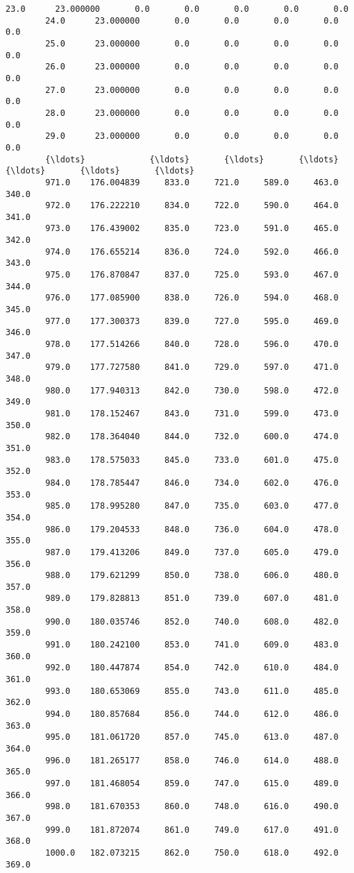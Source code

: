 \documentclass[11pt]{article}
\begin{document}
\begin{Verbatim}[commandchars=\\\{\}]
        23.0      23.000000       0.0       0.0       0.0       0.0       0.0   
        24.0      23.000000       0.0       0.0       0.0       0.0       0.0   
        25.0      23.000000       0.0       0.0       0.0       0.0       0.0   
        26.0      23.000000       0.0       0.0       0.0       0.0       0.0   
        27.0      23.000000       0.0       0.0       0.0       0.0       0.0   
        28.0      23.000000       0.0       0.0       0.0       0.0       0.0   
        29.0      23.000000       0.0       0.0       0.0       0.0       0.0   
        {\ldots}             {\ldots}       {\ldots}       {\ldots}       {\ldots}       {\ldots}       {\ldots}   
        971.0    176.004839     833.0     721.0     589.0     463.0     340.0   
        972.0    176.222210     834.0     722.0     590.0     464.0     341.0   
        973.0    176.439002     835.0     723.0     591.0     465.0     342.0   
        974.0    176.655214     836.0     724.0     592.0     466.0     343.0   
        975.0    176.870847     837.0     725.0     593.0     467.0     344.0   
        976.0    177.085900     838.0     726.0     594.0     468.0     345.0   
        977.0    177.300373     839.0     727.0     595.0     469.0     346.0   
        978.0    177.514266     840.0     728.0     596.0     470.0     347.0   
        979.0    177.727580     841.0     729.0     597.0     471.0     348.0   
        980.0    177.940313     842.0     730.0     598.0     472.0     349.0   
        981.0    178.152467     843.0     731.0     599.0     473.0     350.0   
        982.0    178.364040     844.0     732.0     600.0     474.0     351.0   
        983.0    178.575033     845.0     733.0     601.0     475.0     352.0   
        984.0    178.785447     846.0     734.0     602.0     476.0     353.0   
        985.0    178.995280     847.0     735.0     603.0     477.0     354.0   
        986.0    179.204533     848.0     736.0     604.0     478.0     355.0   
        987.0    179.413206     849.0     737.0     605.0     479.0     356.0   
        988.0    179.621299     850.0     738.0     606.0     480.0     357.0   
        989.0    179.828813     851.0     739.0     607.0     481.0     358.0   
        990.0    180.035746     852.0     740.0     608.0     482.0     359.0   
        991.0    180.242100     853.0     741.0     609.0     483.0     360.0   
        992.0    180.447874     854.0     742.0     610.0     484.0     361.0   
        993.0    180.653069     855.0     743.0     611.0     485.0     362.0   
        994.0    180.857684     856.0     744.0     612.0     486.0     363.0   
        995.0    181.061720     857.0     745.0     613.0     487.0     364.0   
        996.0    181.265177     858.0     746.0     614.0     488.0     365.0   
        997.0    181.468054     859.0     747.0     615.0     489.0     366.0   
        998.0    181.670353     860.0     748.0     616.0     490.0     367.0   
        999.0    181.872074     861.0     749.0     617.0     491.0     368.0   
        1000.0   182.073215     862.0     750.0     618.0     492.0     369.0   
        

\end{Verbatim}
\end{document}
